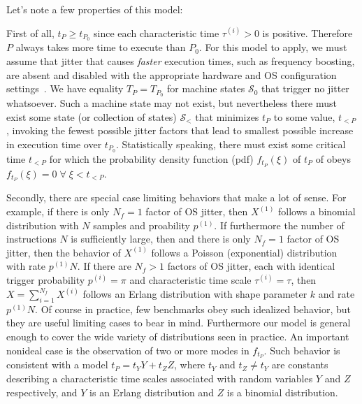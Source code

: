 \documentclass[conference]{IEEEtran}
\begin{document}
Let's note a few properties of this model:

First of all, $t_P \ge t_{P_0}$ since each characteristic time $\tau^{(i)} > 0$ is positive. Therefore $P$ always takes more time to execute than $P_0$.
For this model to apply, we must assume that jitter that causes \textit{faster}
execution times, such as frequency boosting, are absent and disabled with the
appropriate hardware and OS configuration settings~\cite{benchmarktoolschecklist}. We have equality $T_P = T_{P_0}$
for machine states $\mathcal S_0$ that trigger no jitter whatsoever. Such a machine state may not exist, but nevertheless there must exist some state (or collection of states) $\mathcal S_<$ that minimizes $t_P$ to some value, $t_{<P}$, invoking the fewest possible jitter factors that lead to smallest possible increase in execution time over $t_{P_0}$.
Statistically speaking, there must exist some critical time $t_{<P}$ for which the probability density function (pdf) $f_{t_P}(\xi)$ of $t_P$ of obeys $f_{t_P}(\xi) = 0 \; \forall \; \xi < t_{<P}$.

Secondly, there are special case limiting behaviors that make a lot of sense. For example, if there is only $N_f = 1$ factor of OS jitter, then $X^{(1)}$ follows a binomial distribution with $N$ samples and proability $p^{(1)}$. If furthermore the number of instructions $N$ is sufficiently large, then and there is only $N_f = 1$ factor of OS jitter, then the behavior of $X^{(1)}$ follows a Poisson (exponential) distribution with rate $p^{(1)} N$. If there are $N_f > 1$ factors of OS jitter, each with identical trigger probability $p^{(i)} = \pi$ and characteristic time scale $\tau^{(i)} = \tau$, then $X = \sum_{i=1}^{N_f} X^{(i)}$ follows an Erlang distribution with shape parameter $k$ and rate $p^{(1)} N$. Of course in practice, few benchmarks obey such idealized behavior, but they are useful limiting cases to bear in mind. Furthermore our model is general enough to cover the wide variety of distributions seen in practice. An important nonideal case is the observation of two or more modes in $f_{t_P}$. Such behavior is consistent with a model $t_P = t_Y Y + t_Z Z$, where $t_Y$ and $t_Z \ne t_Y$ are constants describing a characteristic time scales associated with random variables $Y$ and $Z$ respectively, and $Y$ is an Erlang distribution and $Z$ is a binomial distribution.

\end{document}
